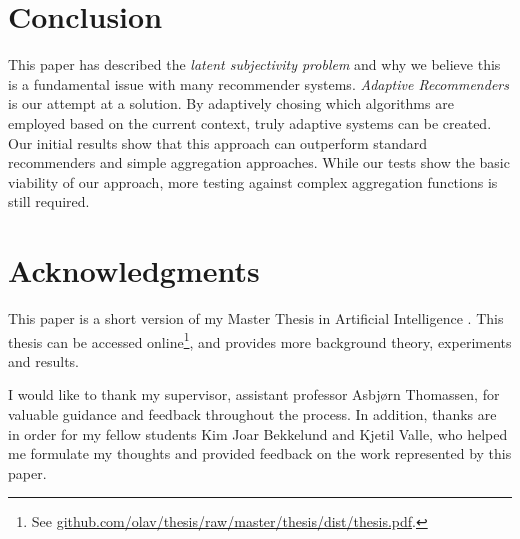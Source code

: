 \section{Conclusion}
\label{sec:conclusion}

This paper has described the \emph{latent subjectivity problem}
and why we believe this is a fundamental issue
with many recommender systems.
\emph{Adaptive Recommenders} is our 
attempt at a solution.
By adaptively chosing which algorithms are employed
based on the current context,
truly adaptive systems can be created.
Our initial results show that this approach
can outperform standard recommenders
and simple aggregation approaches.
While our tests show the basic viability of our approach,
more testing against complex aggregation functions
is still required.


\section*{Acknowledgments}
\label{sec:method}

This paper is a short version of my Master Thesis in Artificial Intelligence
\cite{Bjorkoy2011}.
This thesis can be accessed 
online\footnote{See \url{github.com/olav/thesis/raw/master/thesis/dist/thesis.pdf}.},
and provides more background theory, 
experiments and results.

I would like to thank my supervisor, assistant professor Asbjørn Thomassen, for valuable guidance and feedback throughout the process.
In addition, thanks are in order for my fellow students 
Kim Joar Bekkelund and Kjetil Valle,
who helped me formulate my thoughts and provided feedback on the work represented by this paper.



